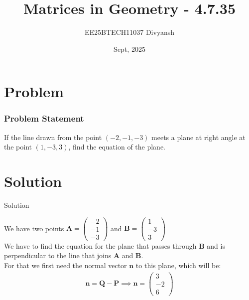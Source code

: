 \documentclass{beamer}
\title{Matrices in Geometry - 4.7.35}
\author{EE25BTECH11037  Divyansh}
\date{Sept, 2025}
\let\vec\mathbf
\providecommand{\brak}[1]{\ensuremath{\left(#1\right)}}
\theoremstyle{remark}
\newcommand{\myvec}[1]{\ensuremath{\begin{pmatrix}#1\end{pmatrix}}}
\begin{document}
\maketitle


\section{Problem}
\begin{frame}
\frametitle{Problem Statement}
If the line drawn from the point \brak{-2,-1,-3} meets a plane at right angle at the point \brak{1,-3,3}, find the equation of the plane.
\end{frame}

\section{Solution}
\begin{frame}{Solution}
   
We have two points $\vec{A}=\myvec{-2\\ -1 \\ -3}$ and $\vec{B}=\myvec{1\\  -3\\ 3}$\\
We have to find the equation for the plane that passes through $\vec{B}$ and is perpendicular to the line that joins $\vec{A}$ and $\vec{B}$.\\
For that we first need the normal vector $\vec{n}$ to this plane, which will be:
\begin{align}
    \vec{n}=\vec{Q}-\vec{P} \implies \vec{n} =\myvec{3 \\ -2 \\ 6}
\end{align}
\end{frame}
\end{document}
